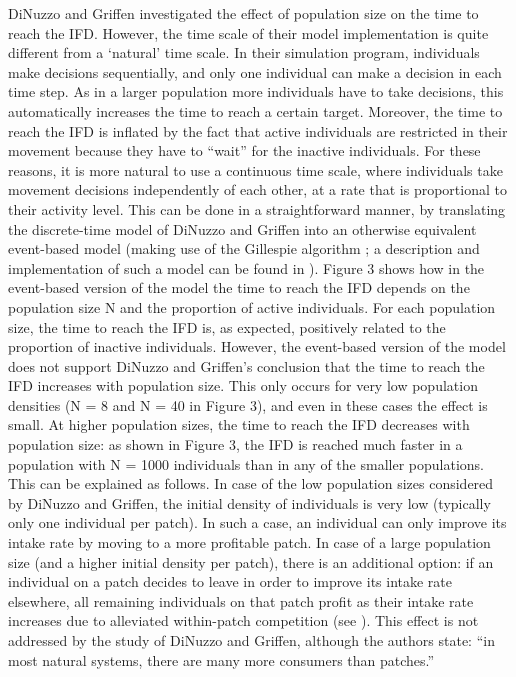 	DiNuzzo and Griffen investigated the effect of population size on the time to reach the IFD.
	However, the time scale of their model implementation is quite different from a `natural' time scale.
	In their simulation program, individuals make decisions sequentially, and only one individual can make a decision in each time step.
	As in a larger population more individuals have to take decisions, this automatically increases the time to reach a certain target.
	Moreover, the time to reach the IFD is inflated by the fact that active individuals are restricted in their movement because they have to ``wait'' for the inactive individuals.
	For these reasons, it is more natural to use a continuous time scale, where individuals take movement decisions independently of each other, at a rate that is proportional to their activity level.
	This can be done in a straightforward manner, by translating the discrete-time model of DiNuzzo and Griffen into an otherwise equivalent event-based model (making use of the Gillespie algorithm \cite{gillespie1976}; a description and implementation of such a model can be found in \cite{netz2021b}).
	Figure 3 shows how in the event-based version of the model the time to reach the IFD depends on the population size N and the proportion of active individuals.
	For each population size, the time to reach the IFD is, as expected, positively related to the proportion of inactive individuals.
	However, the event-based version of the model does not support DiNuzzo and Griffen's conclusion that the time to reach the IFD increases with population size.
	This only occurs for very low population densities (N = 8 and N = 40 in Figure 3), and even in these cases the effect is small.
	At higher population sizes, the time to reach the IFD decreases with population size: as shown in Figure 3, the IFD is reached much faster in a population with N = 1000 individuals than in any of the smaller populations.
	This can be explained as follows.
	In case of the low population sizes considered by DiNuzzo and Griffen, the initial density of individuals is very low (typically only one individual per patch).
	In such a case, an individual can only improve its intake rate by moving to a more profitable patch.
	In case of a large population size (and a higher initial density per patch), there is an additional option: if an individual on a patch decides to leave in order to improve its intake rate elsewhere, all remaining individuals on that patch profit as their intake rate increases due to alleviated within-patch competition (see \citep{wolf2008a}).
	This effect is not addressed by the study of DiNuzzo and Griffen, although the authors state: ``in most natural systems, there are many more consumers than patches.'' 

